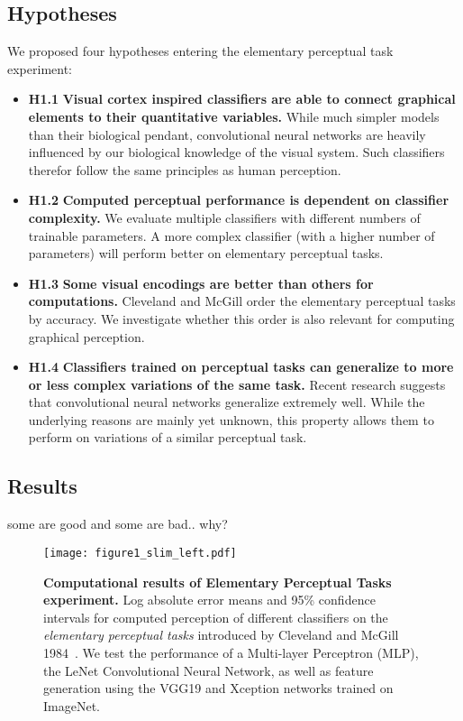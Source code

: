 \subsection{Hypotheses}

We proposed four hypotheses entering the elementary perceptual task experiment:

\begin{itemize}
	\item \textbf{H1.1} \textbf{Visual cortex inspired classifiers are able to connect graphical elements to their quantitative variables.} While much simpler models than their biological pendant, convolutional neural networks are heavily influenced by our biological knowledge of the visual system. Such classifiers therefor follow the same principles as human perception.
	\item \textbf{H1.2} \textbf{Computed perceptual performance is dependent on classifier complexity.} We evaluate multiple classifiers with different numbers of trainable parameters. A more complex classifier (with a higher number of parameters) will perform better on elementary perceptual tasks.
	\item \textbf{H1.3} \textbf{Some visual encodings are better than others for computations.} Cleveland and McGill order the elementary perceptual tasks by accuracy. We investigate whether this order is also relevant for computing graphical perception.
	\item \textbf{H1.4} \textbf{Classifiers trained on perceptual tasks can generalize to more or less complex variations of the same task.} Recent research suggests that convolutional neural networks generalize extremely well. While the underlying reasons are mainly yet unknown, this property allows them to perform on variations of a similar perceptual task.
\end{itemize}

\subsection{Results}


some are good and some are bad.. why?

\begin{figure}[h]
	\centering
	  \texttt{[image: figure1\_slim\_left.pdf]}
  \caption{\textbf{Computational results of Elementary Perceptual Tasks experiment.} Log absolute error means and 95\% confidence intervals for computed perception of different classifiers on the \emph{elementary perceptual tasks} introduced by Cleveland and McGill 1984~\cite{cleveland_mcgill}. We test the performance of a Multi-layer Perceptron (MLP), the LeNet Convolutional Neural Network, as well as feature generation using the VGG19 and Xception networks trained on ImageNet.}
	\label{fig:figure1_results}
\end{figure}

